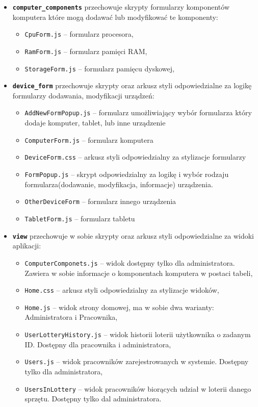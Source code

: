 \begin {itemize}
\item \texttt{\textbf{computer\_components}} przechowuje skrypty formularzy komponentów komputera które mogą dodawać lub modyfikować te komponenty:
	\begin{itemize}
	\item \texttt{CpuForm.js} -- formularz procesora,
	\item \texttt{RamForm.js} -- formularz pamięci RAM,
	\item \texttt{StorageForm.js} -- formularz pamięcu dyskowej,
	\end{itemize}
\item \texttt{\textbf{device\_form}} przechowuje skrypty oraz arkusz styli odpowiedzialne za logikę formularzy dodawania, modyfikacji urządzeń:
	\begin{itemize}
	\item \texttt{AddNewFormPopup.js} -- formularz umożliwiający wybór formularza który dodaje komputer, tablet, lub inne urządzenie
	\item \texttt{ComputerForm.js} -- formularz komputera
	\item \texttt{DeviceForm.css} -- arkusz styli odpowiedzialny za stylizacje formularzy
	\item \texttt{FormPopup.js} -- skrypt odpowiedzialny za logikę i wybór rodzaju formularza(dodawanie, modyfikacja, informacje) urządzenia.
	\item \texttt{OtherDeviceForm} -- formularz innego urządzenia
	\item \texttt{TabletForm.js} -- formularz tabletu
	\end{itemize}
\item \texttt{\textbf{view}} przechowuje w sobie skrypty oraz arkusz styli odpowiedzialne za widoki aplikacji:
	\begin{itemize}
	\item \texttt{ComputerComponets.js} -- widok dostępny tylko dla administratora. Zawiera w sobie informacje o komponentach komputera w postaci tabeli,
	\item \texttt{Home.css} -- arkusz styli odpowiedzialny za stylizacje widoków,
	\item \texttt{Home.js} -- widok strony domowej, ma w sobie dwa warianty: Administratora i Pracownika,
	\item \texttt{UserLotteryHistory.js} -- widok historii loterii użytkownika o zadanym ID. Dostępny dla pracownika i administratora,
	\item \texttt{Users.js} -- widok pracowników zarejestrowanych w systemie. Dostępny tylko dla administratora,
	\item \texttt{UsersInLottery} -- widok pracowników biorących udział w loterii danego sprzętu. Dostępny tylko dal administratora.
	\end{itemize}
\end{itemize}

